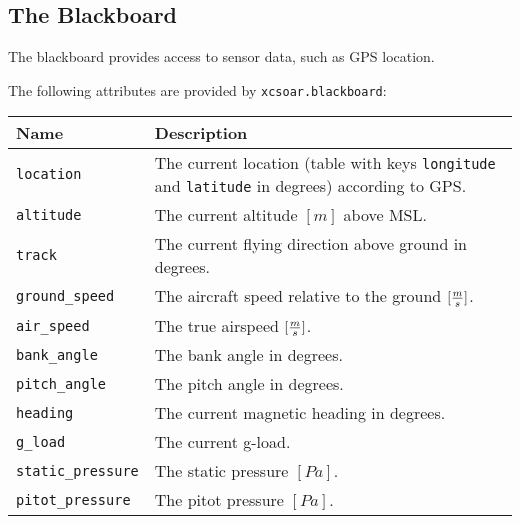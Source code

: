 \subsection{The Blackboard}

The blackboard provides access to sensor data, such as GPS location.

The following attributes are provided by \verb|xcsoar.blackboard|:

\begin{maxipage}
\begin{tabular}{l|p{12cm}}
Name & Description \\
\hline\hline

\verb|location| & The current location (table with
keys \verb|longitude| and \verb|latitude| in degrees) according to
GPS. \\

\hline

\verb|altitude| & The current altitude $[m]$ above MSL. \\

\hline

\verb|track| & The current flying direction above ground in degrees. \\

\hline

\verb|ground_speed| & The aircraft speed relative to the ground
$[{m \over s}]$. \\

\hline

\verb|air_speed| & The true airspeed
$[{m \over s}]$. \\

\hline

\verb|bank_angle| & The bank angle in degrees. \\

\hline

\verb|pitch_angle| & The pitch angle in degrees. \\

\hline

\verb|heading| & The current magnetic heading in degrees. \\

\hline

\verb|g_load| & The current g-load. \\

\hline

\verb|static_pressure| & The static pressure
$[{Pa}]$. \\

\hline

\verb|pitot_pressure| & The pitot pressure
$[{Pa}]$. \\

\end{tabular}
\end{maxipage}

